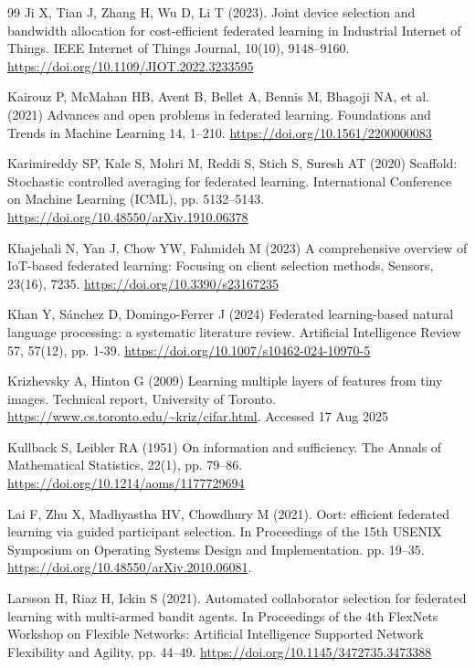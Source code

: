 \documentclass[pdflatex,sn-mathphys-num,oneside]{sn-jnl}%
\theoremstyle{thmstyleone}%
\theoremstyle{thmstyletwo}%
\theoremstyle{thmstylethree}%
\begin{document}
\begin{thebibliography}{99}
Ji X, Tian J, Zhang H, Wu D, Li T (2023). Joint device selection and bandwidth allocation for cost-efficient federated learning in Industrial Internet of Things. IEEE Internet of Things Journal, 10(10), 9148–9160. \url{https://doi.org/10.1109/JIOT.2022.3233595}

Kairouz P, McMahan HB, Avent B, Bellet A, Bennis M, Bhagoji NA, et al. (2021) Advances and open problems in federated learning. Foundations and Trends in Machine Learning 14, 1–210. \url{https://doi.org/10.1561/2200000083}

Karimireddy SP, Kale S, Mohri M, Reddi S, Stich S, Suresh AT (2020) Scaffold: Stochastic controlled averaging for federated learning. International Conference on Machine Learning (ICML), pp. 5132–5143. \url{https://doi.org/10.48550/arXiv.1910.06378}

Khajehali N, Yan J, Chow YW, Fahmideh M (2023) A comprehensive overview of IoT-based federated learning: Focusing on client selection methods, Sensors, 23(16), 7235. \url{https://doi.org/10.3390/s23167235}

Khan Y, Sánchez D, Domingo-Ferrer J (2024) Federated learning-based natural language processing: a systematic literature review. Artificial Intelligence Review 57, 57(12), pp. 1-39. \url{https://doi.org/10.1007/s10462-024-10970-5}

Krizhevsky A, Hinton G (2009) Learning multiple layers of features from tiny images. Technical report, University of Toronto. \url{https://www.cs.toronto.edu/~kriz/cifar.html}. Accessed 17 Aug 2025

Kullback S, Leibler RA (1951) On information and sufficiency. The Annals of Mathematical Statistics, 22(1), pp. 79–86. \url{https://doi.org/10.1214/aoms/1177729694}

Lai F, Zhu X, Madhyastha HV, Chowdhury M (2021). Oort: efficient federated learning via guided participant selection. In Proceedings of the 15th USENIX Symposium on Operating Systems Design and Implementation. pp. 19–35. \url{https://doi.org/10.48550/arXiv.2010.06081}.

Larsson H, Riaz H, Ickin S (2021). Automated collaborator selection for federated learning with multi-armed bandit agents. In Proceedings of the 4th FlexNets Workshop on Flexible Networks: Artificial Intelligence Supported Network Flexibility and Agility, pp. 44–49. \url{https://doi.org/10.1145/3472735.3473388}


\end{thebibliography}
\end{document}
